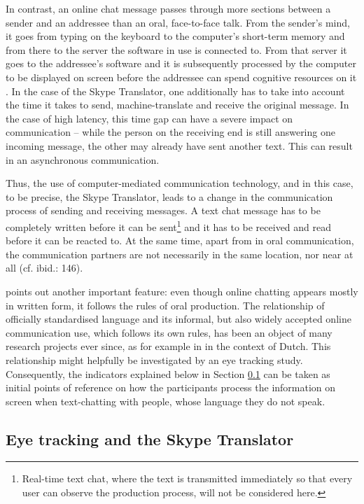 \documentclass[output=paper]{langscibook}
\begin{document}
    In contrast, an online chat message passes through more sections between a sender and an addressee than an oral, face-to-face talk. From the sender's mind, it goes from typing on the keyboard to the computer's short-term memory and from there to the server the software in use is connected to. From that server it goes to the addressee's software and it is subsequently processed by the computer to be displayed on screen before the addressee can spend cognitive resources on it \citep[cf.][146]{beisswenger_empirische_2017}. In the case of the Skype Translator, one additionally has to take into account the time it takes to send, machine-translate and receive the original message. In the case of high latency, this time gap can have a severe impact on communication -- while the person on the receiving end is still answering one incoming message, the other may already have sent another text. This can result in an asynchronous communication.
    
    Thus, the use of computer-mediated communication technology, and in this case, to be precise, the Skype Translator, leads to a change in the communication process of sending and receiving messages. A text chat message has to be completely written before it can be sent\footnote{Real-time text chat, where the text is transmitted immediately so that every user can observe the production process, will not be considered here.} and it has to be received and read before it can be reacted to. At the same time, apart from in oral communication, the communication partners are not necessarily in the same location, nor near at all (cf. ibid.: 146). 
    
    \citet[cf.][3]{storrer_sprachliche_2001} points out another important feature: even though online chatting appears mostly in written form, it follows the rules of oral production. The relationship of officially standardised language and its informal, but also widely accepted online communication use, which follows its own rules, has been an object of many research projects ever since, as for example in \citet{fiser_whatsapp_2017} in the context of Dutch. This relationship might helpfully be investigated by an eye tracking study.
    Consequently, the indicators explained below in Section \ref{subsec:eyetracking} can be taken as initial points of reference on how the participants process the information on screen when text-chatting with people, whose language they do not speak.
    
    
    \subsection{Eye tracking and the Skype Translator}
    \label{subsec:eyetracking}
    
\end{document}

